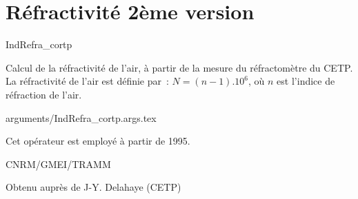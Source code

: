 %
\section{R\'efractivit\'e 2\`eme version }

 {\sf IndRefra\_cortp}

Calcul de la r\'efractivit\'e de l'air, \`a 
partir de la mesure du r\'efractom\`etre du CETP.\newline
La r\'efractivit\'e de l'air est d\'efinie par~:
$ N = (n -1).10^6 $, o\`u $n$ est l'indice de r\'efraction de
l'air.

\bigskip
 {arguments/IndRefra_cortp.args.tex}





Cet op\'erateur est employ\'e \`a partir de 1995.

CNRM/GMEI/TRAMM


Obtenu aupr\`es de J-Y. Delahaye (CETP)

